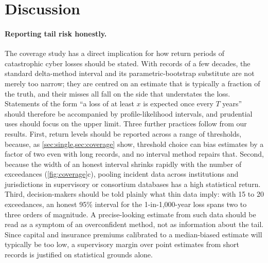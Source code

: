 \section{Discussion}\label{sec:discussion}

\paragraph{Reporting tail risk honestly.} The coverage study has a direct implication for how return periods of catastrophic cyber losses should be stated. With records of a few decades, the standard delta-method interval and its parametric-bootstrap substitute are not merely too narrow; they are centred on an estimate that is typically a fraction of the truth, and their misses all fall on the side that understates the loss. Statements of the form ``a loss of at least $x$ is expected once every $T$ years'' should therefore be accompanied by profile-likelihood intervals, and prudential uses should focus on the upper limit. Three further practices follow from our results. First, return levels should be reported across a range of thresholds, because, as \cref{sec:single,sec:coverage} show, threshold choice can bias estimates by a factor of two even with long records, and no interval method repairs that. Second, because the width of an honest interval shrinks rapidly with the number of exceedances (\cref{fig:coverage}c), pooling incident data across institutions and jurisdictions in supervisory or consortium databases has a high statistical return. Third, decision-makers should be told plainly what thin data imply: with 15 to 20 exceedances, an honest 95\% interval for the 1-in-1,000-year loss spans two to three orders of magnitude. A precise-looking estimate from such data should be read as a symptom of an overconfident method, not as information about the tail. Since capital and insurance premiums calibrated to a median-biased estimate will typically be too low, a supervisory margin over point estimates from short records is justified on statistical grounds alone.

